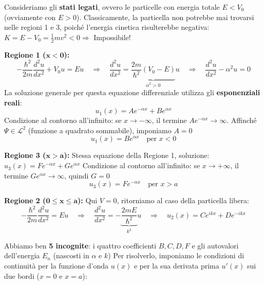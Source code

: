 \documentclass[11pt, a4paper]{article}
\begin{document}
\noindent
Consideriamo gli \textbf{stati legati}, ovvero le particelle con energia totale $E < V_0$ (ovviamente con $E > 0$). %
Classicamente, la particella non potrebbe mai trovarsi nelle regioni 1 e 3, poiché l'energia cinetica risulterebbe negativa: $K = E - V_0 = \frac{1}{2}mv^2 < 0 \Rightarrow$ Impossibile! %

\noindent
\textbf{Regione 1 ($\mathbf{x < 0}$):} %
\begin{equation*}
    -\frac{\hbar^2}{2m} \frac{d^2 u}{dx^2} + V_0 u = E u \quad \Rightarrow \quad \frac{d^2 u}{dx^2} = \underbrace{\frac{2m}{\hbar^2}(V_0 - E)}_{\alpha^2 > 0} u \quad \Rightarrow \quad \frac{d^2 u}{dx^2} - \alpha^2 u = 0 %
\end{equation*}
La soluzione generale per questa equazione differenziale utilizza gli \textbf{esponenziali reali}: %
\begin{equation*}
    u_1(x) = A e^{-\alpha x} + B e^{\alpha x} %
\end{equation*}
Condizione al contorno all'infinito: se $x \to -\infty$, il termine $A e^{-\alpha x} \to \infty$. Affinché $\Psi \in \mathcal{L}^2$ (funzione a quadrato sommabile), imponiamo $A=0$ %
\begin{equation}
    \boxed{ u_1(x) = B e^{\alpha x} } \quad \text{per } x < 0 %
\end{equation}

\noindent
\textbf{Regione 3 ($\mathbf{x > a}$):} %
Stessa equazione della Regione 1, soluzione: $u_3(x) = F e^{-\alpha x} + G e^{\alpha x}$ %
Condizione al contorno all'infinito: se $x \to +\infty$, il termine $G e^{\alpha x} \to \infty$, quindi $G=0$ %
\begin{equation}
    \boxed{ u_3(x) = F e^{-\alpha x} } \quad \text{per } x > a %
\end{equation}

\noindent
\textbf{Regione 2 ($\mathbf{0 \le x \le a}$):} %
Qui $V=0$, ritorniamo al caso della particella libera: %
\begin{equation*}
    -\frac{\hbar^2}{2m} \frac{d^2 u}{dx^2} = E u \quad \Rightarrow \quad \frac{d^2 u}{dx^2} = -\underbrace{\frac{2mE}{\hbar^2}}_{k^2} u \quad \Rightarrow \quad \boxed{ u_2(x) = C e^{ikx} + D e^{-ikx} } %
\end{equation*}

\noindent
Abbiamo ben \textbf{5 incognite}: i quattro coefficienti $B, C, D, F$ e gli autovalori dell'energia $E_n$ (nascosti in $\alpha$ e $k$) %
Per risolverlo, imponiamo le condizioni di continuità per la funzione d'onda $u(x)$ e per la sua derivata prima $u'(x)$ sui due bordi ($x=0$ e $x=a$): %
\end{document}
